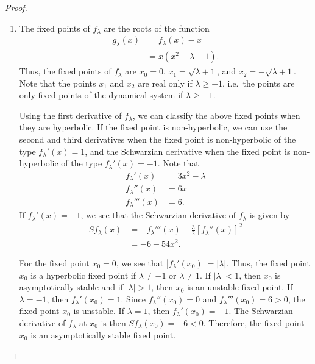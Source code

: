 \begin{proof}
  \begin{enumerate}
    \item The fixed points of $f_\lambda$ are the roots of the function
      \begin{align*}
        g_\lambda(x) &= f_\lambda(x) - x\\
        &= x(x^2 - \lambda  - 1).
      \end{align*}
      Thus, the fixed points of $f_\lambda$ are $x_0 = 0$, $x_1 = \sqrt{\lambda + 1}$, and $x_2 = -\sqrt{\lambda + 1}$.
      Note that the points $x_1$ and $x_2$ are real only if $\lambda \geq -1$, i.e.\
      the points are only fixed points of the dynamical system if $\lambda \geq -1$.

      Using the first derivative of $f_\lambda$, we can classify the above fixed points
      when they are hyperbolic. If the fixed point is non-hyperbolic, we can use
      the second and third derivatives when the fixed point is non-hyperbolic
      of the type $f_\lambda'(x) = 1$, and the Schwarzian derivative when the fixed point is non-hyperbolic
      of the type $f_\lambda'(x) = -1$.      Note that
      \begin{align*}
        f_\lambda'(x) &= 3x^2 - \lambda \\
        f_\lambda''(x) &= 6x \\
        f_\lambda'''(x) &= 6.
      \end{align*}
      If $f_\lambda'(x) = -1$, we see that the Schwarzian derivative of $f_\lambda$ is given by
      \begin{align*}
        Sf_\lambda(x) &= -f_\lambda'''(x) - \frac{3}{2} \left[f_\lambda''(x)\right]^2 \\
        &= -6 - 54x^2.
      \end{align*}

      For the fixed point $x_0 = 0$, we see that $|f_\lambda'(x_0)| = |\lambda|$. Thus, the fixed point $x_0$ is
      a hyperbolic fixed point if $\lambda \neq -1$ or $\lambda \neq 1$. If $|\lambda| < 1$, then $x_0$ is asymptotically stable
      and if $|\lambda| > 1$, then $x_0$ is an unstable fixed point. If $\lambda = -1$, then $f_\lambda'(x_0) = 1$.
      Since $f_\lambda''(x_0) = 0$ and $f_\lambda'''(x_0) = 6 > 0$, the fixed point $x_0$ is unstable. If $\lambda = 1$,
      then $f_\lambda'(x_0) = -1$. The Schwarzian derivative of $f_\lambda$ at $x_0$ is then $Sf_\lambda(x_0) = -6 < 0$. Therefore,
      the fixed point $x_0$ is an asymptotically stable fixed point.


\end{enumerate}
\end{proof}
